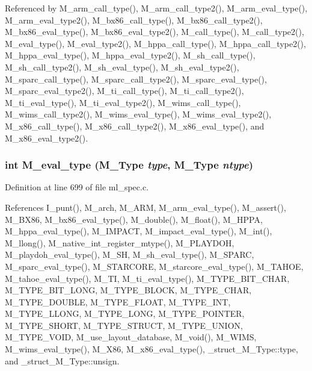Referenced by M\_\-arm\_\-call\_\-type(), M\_\-arm\_\-call\_\-type2(), M\_\-arm\_\-eval\_\-type(), M\_\-arm\_\-eval\_\-type2(), M\_\-bx86\_\-call\_\-type(), M\_\-bx86\_\-call\_\-type2(), M\_\-bx86\_\-eval\_\-type(), M\_\-bx86\_\-eval\_\-type2(), M\_\-call\_\-type(), M\_\-call\_\-type2(), M\_\-eval\_\-type(), M\_\-eval\_\-type2(), M\_\-hppa\_\-call\_\-type(), M\_\-hppa\_\-call\_\-type2(), M\_\-hppa\_\-eval\_\-type(), M\_\-hppa\_\-eval\_\-type2(), M\_\-sh\_\-call\_\-type(), M\_\-sh\_\-call\_\-type2(), M\_\-sh\_\-eval\_\-type(), M\_\-sh\_\-eval\_\-type2(), M\_\-sparc\_\-call\_\-type(), M\_\-sparc\_\-call\_\-type2(), M\_\-sparc\_\-eval\_\-type(), M\_\-sparc\_\-eval\_\-type2(), M\_\-ti\_\-call\_\-type(), M\_\-ti\_\-call\_\-type2(), M\_\-ti\_\-eval\_\-type(), M\_\-ti\_\-eval\_\-type2(), M\_\-wims\_\-call\_\-type(), M\_\-wims\_\-call\_\-type2(), M\_\-wims\_\-eval\_\-type(), M\_\-wims\_\-eval\_\-type2(), M\_\-x86\_\-call\_\-type(), M\_\-x86\_\-call\_\-type2(), M\_\-x86\_\-eval\_\-type(), and M\_\-x86\_\-eval\_\-type2().
\subsubsection{\setlength{\rightskip}{0pt plus 5cm}int M\_\-eval\_\-type (\bf{M\_\-Type} {\em type}, \bf{M\_\-Type} {\em ntype})}\label{ml__spec_8c_f7364cdf9256109f39c97b07c7c30d79}




Definition at line 699 of file ml\_\-spec.c.

References I\_\-punt(), M\_\-arch, M\_\-ARM, M\_\-arm\_\-eval\_\-type(), M\_\-assert(), M\_\-BX86, M\_\-bx86\_\-eval\_\-type(), M\_\-double(), M\_\-float(), M\_\-HPPA, M\_\-hppa\_\-eval\_\-type(), M\_\-IMPACT, M\_\-impact\_\-eval\_\-type(), M\_\-int(), M\_\-llong(), M\_\-native\_\-int\_\-register\_\-mtype(), M\_\-PLAYDOH, M\_\-playdoh\_\-eval\_\-type(), M\_\-SH, M\_\-sh\_\-eval\_\-type(), M\_\-SPARC, M\_\-sparc\_\-eval\_\-type(), M\_\-STARCORE, M\_\-starcore\_\-eval\_\-type(), M\_\-TAHOE, M\_\-tahoe\_\-eval\_\-type(), M\_\-TI, M\_\-ti\_\-eval\_\-type(), M\_\-TYPE\_\-BIT\_\-CHAR, M\_\-TYPE\_\-BIT\_\-LONG, M\_\-TYPE\_\-BLOCK, M\_\-TYPE\_\-CHAR, M\_\-TYPE\_\-DOUBLE, M\_\-TYPE\_\-FLOAT, M\_\-TYPE\_\-INT, M\_\-TYPE\_\-LLONG, M\_\-TYPE\_\-LONG, M\_\-TYPE\_\-POINTER, M\_\-TYPE\_\-SHORT, M\_\-TYPE\_\-STRUCT, M\_\-TYPE\_\-UNION, M\_\-TYPE\_\-VOID, M\_\-use\_\-layout\_\-database, M\_\-void(), M\_\-WIMS, M\_\-wims\_\-eval\_\-type(), M\_\-X86, M\_\-x86\_\-eval\_\-type(), \_\-struct\_\-M\_\-Type::type, and \_\-struct\_\-M\_\-Type::unsign.

